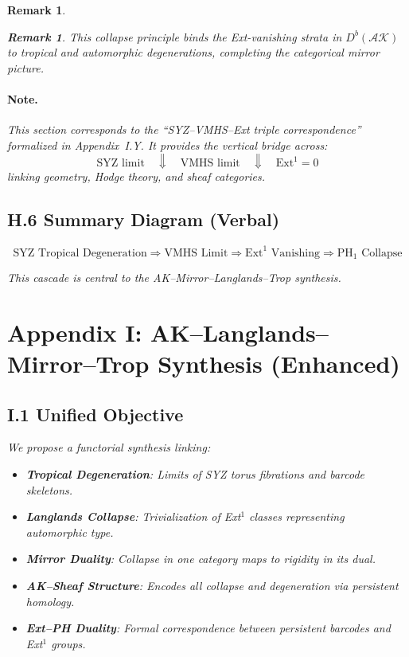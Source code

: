 \documentclass[11pt]{article}
\newtheorem{remark}[theorem]{Remark}
\begin{document}
\begin{remark}
\begin{remark}
This collapse principle binds the Ext-vanishing strata in $D^b(\mathcal{AK})$ to tropical and automorphic degenerations, completing the categorical mirror picture.
\end{remark}

\paragraph{Note.}
This section corresponds to the “SYZ–VMHS–Ext triple correspondence” formalized in Appendix~I.Y. It provides the vertical bridge across:
\[
\text{SYZ limit} \quad \Downarrow \quad \text{VMHS limit} \quad \Downarrow \quad \mathrm{Ext}^1 = 0
\]
linking geometry, Hodge theory, and sheaf categories.

\subsection*{H.6 Summary Diagram (Verbal)}

\[
\text{SYZ Tropical Degeneration}
\Rightarrow
\text{VMHS Limit}
\Rightarrow
\mathrm{Ext}^1 \text{ Vanishing}
\Rightarrow
\mathrm{PH}_1 \text{ Collapse}
\]

This cascade is central to the AK–Mirror–Langlands–Trop synthesis.



\section*{Appendix I: AK–Langlands–Mirror–Trop Synthesis (Enhanced)}

\subsection*{I.1 Unified Objective}

We propose a functorial synthesis linking:

\begin{itemize}
  \item \textbf{Tropical Degeneration}: Limits of SYZ torus fibrations and barcode skeletons.
  \item \textbf{Langlands Collapse}: Trivialization of Ext$^1$ classes representing automorphic type.
  \item \textbf{Mirror Duality}: Collapse in one category maps to rigidity in its dual.
  \item \textbf{AK–Sheaf Structure}: Encodes all collapse and degeneration via persistent homology.
  \item \textbf{Ext–PH Duality}: Formal correspondence between persistent barcodes and Ext${}^1$ groups.
\end{itemize}


\end{remark}
\end{document}
